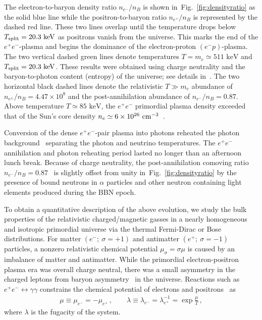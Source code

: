 \documentclass[aps,prd,floatfix,reprint]{revtex4-2}
\newcommand*{\keV}{\text{ keV}}
\newcommand{\rf}[1]{Fig.~{\ref{#1}}}
\begin{document}
The electron-to-baryon density ratio $n_{e^{-}}/n_{B}$ is shown in~\rf{fig:densityratio} as the solid blue line while the positron-to-baryon ratio $n_{e^{+}}/n_{B}$ is represented by the dashed red line. These two lines overlap until the temperature drops below $T_{\rm split}=20.3\keV$ as positrons vanish from the universe. This marks the end of the $e^{+}e^{-}$-plasma and begins the dominance of the electron-proton $(e^{-}p)$-plasma. The two vertical dashed green lines denote temperatures $T=m_{e}\simeq511\keV$ and $T_{\rm split}=20.3\keV$. These results were obtained using charge neutrality and the baryon-to-photon content (entropy) of the universe; see details in~\cite{Rafelski:2023emw}. The two horizontal black dashed lines denote the relativistic $T\gg m_e$ abundance of $n_{e^{\pm}}/n_{B}=4.47\times10^{8}$ and the post-annihilation abundance of $n_{e^{-}}/n_{B}=0.87$. Above temperature $T\simeq85\keV$, the $e^{+}e^{-}$ primordial plasma density exceeded that of the Sun's core density $n_{e}\simeq6\times10^{26}{\rm\ cm}^{-3}$~\cite{Bahcall:2000nu}. 

Conversion of the dense $e^{+}e^{-}$-pair plasma into photons reheated the photon background~\cite{Birrell:2014uka} separating the photon and neutrino temperatures. The $e^{+}e^{-}$ annihilation and photon reheating period lasted no longer than an afternoon lunch break. Because of charge neutrality, the post-annihilation comoving ratio $n_{e^{-}}/n_{B}=0.87$~\cite{Rafelski:2023emw} is slightly offset from unity in~\rf{fig:densityratio} by the presence of bound neutrons in $\alpha$ particles and other neutron containing light elements produced during the BBN epoch. 

To obtain a quantitative description of the above evolution, we study the bulk properties of the relativistic charged/magnetic gasses in a nearly homogeneous and isotropic primordial universe via the thermal Fermi-Dirac or Bose distributions. For matter $(e^{-};\ \sigma=+1)$ and antimatter $(e^{+};\ \sigma=-1)$ particles, a nonzero relativistic chemical potential $\mu_{\sigma}=\sigma\mu$ is caused by an imbalance of matter and antimatter. While the primordial electron-positron plasma era was overall charge neutral, there was a small asymmetry in the charged leptons from baryon asymmetry~\cite{Fromerth:2012fe,Canetti:2012zc} in the universe. Reactions such as $e^{+}e^{-}\leftrightarrow\gamma\gamma$ constrains the chemical potential of electrons and positrons~\cite{Elze:1980er} as 
\begin{align}
 \label{cpotential}
 \mu\equiv\mu_{e^{-}}=-\mu_{e^{+}}\,,\qquad
 \lambda\equiv\lambda_{e^{-}}=\lambda_{e^{+}}^{-1}=\exp\frac{\mu}{T}\,,
\end{align}
where $\lambda$ is the fugacity of the system. 
\end{document}
